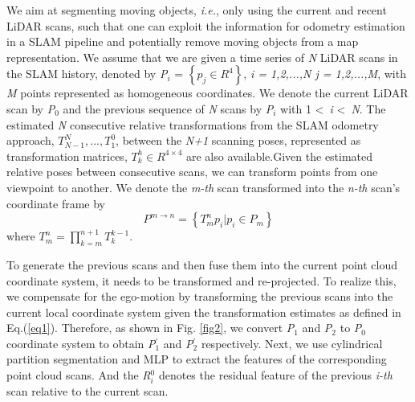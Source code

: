 \documentclass[lettersize,journal]{IEEEtran}
\begin{document}
We aim at segmenting moving objects, \emph{i.e.}, only using the current and recent LiDAR scans, such that one can exploit the information for odometry estimation in a SLAM pipeline and potentially remove moving objects from a map representation. We assume that we are given a time series of \emph{N} LiDAR scans in the SLAM history, denoted by \emph{P$_i$} = $\left\{p_j \in R^4   \right\}$, \emph{i = 1,2,...,N j = 1,2,...,M}, with \emph{M} points represented as homogeneous coordinates. We denote the current LiDAR scan by \emph{P$_0$} and the previous sequence of \emph{N} scans by \emph{P$_i$} with 1 \textless \, \emph{i} \textless \, \emph{N}. The estimated \emph{N} consecutive relative transformations from the SLAM odometry approach, $T_{N-1}^{N}  , . . . , T_1^0$, between the \emph{N+1} scanning poses, represented as transformation matrices, $T_k^h \in R^{4 \times 4}$ are also available.Given the estimated relative poses between consecutive scans, we can transform points from one viewpoint to another. We denote the \emph{m-th} scan transformed into the \emph{n-th} scan’s coordinate frame by
\begin{equation}
    P^{m\rightarrow n} = \left\{T_m^n p_i |p_i \in P_m  \right\}
\label{eq1}
\end{equation}
where $T_m^n = \prod_{k=m}^{n+1} T_k^{k-1}$.

To generate the previous scans and then fuse them into the current point cloud coordinate system, it needs to be transformed and re-projected. To realize this, we compensate for the ego-motion by transforming the previous scans into the current local coordinate system given the transformation estimates as defined in Eq.(\ref{eq1}). Therefore, as shown in Fig. \ref{fig2}, we convert \emph{P$_1$} and \emph{P$_2$} to \emph{P$_0$} coordinate system to obtain \emph{P$_1^{'}$} and \emph{P$_2^{'}$} respectively. Next, we use cylindrical partition segmentation and MLP to extract the features of the corresponding point cloud scans. And the \emph{R$_i^0$} denotes the residual feature of the previous \emph{i-th} scan relative to the current scan.
\end{document}
